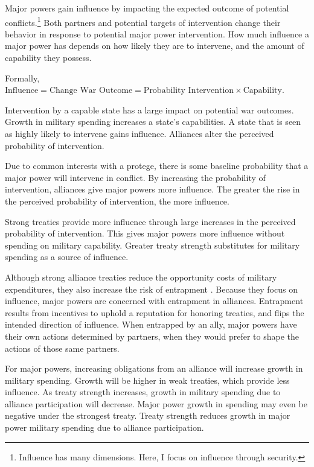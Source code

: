 \documentclass[12pt]{article}
\begin{document}
Major powers gain influence by impacting the expected outcome of potential conflicts.\footnote{Influence has many dimensions. Here, I focus on influence through security.} 
Both partners and potential targets of intervention change their behavior in response to potential major power intervention. 
How much influence a major power has depends on how likely they are to intervene, and the amount of capability they possess. 


Formally, $\mbox{Influence} = \mbox{Change War Outcome} = \mbox{Probability Intervention} \times \mbox{Capability}$.


Intervention by a capable state has a large impact on potential war outcomes.
Growth in military spending increases a state's capabilities.  
A state that is seen as highly likely to intervene gains influence.
Alliances alter the perceived probability of intervention. 


Due to common interests with a protege, there is some baseline probability that a major power will intervene in conflict. 
By increasing the probability of intervention, alliances give major powers more influence. 
The greater the rise in the perceived probability of intervention, the more influence.


Strong treaties provide more influence through large increases in the perceived probability of intervention. 
This gives major powers more influence without spending on military capability. 
Greater treaty strength substitutes for military spending as a source of influence.  


Although strong alliance treaties reduce the opportunity costs of military expenditures, they also increase the risk of entrapment \citep{Snyder1997, Benson2012, Yarhi-Miloetal2016}.
Because they focus on influence, major powers are concerned with entrapment in alliances. 
Entrapment results from incentives to uphold a reputation for honoring treaties, and flips the intended direction of influence. 
When entrapped by an ally, major powers have their own actions determined by partners, when they would prefer to shape the actions of those same partners. 


For major powers, increasing obligations from an alliance will increase growth in military spending. 
Growth will be higher in weak treaties, which provide less influence. 
As treaty strength increases, growth in military spending due to alliance participation will decrease. 
Major power growth in spending may even be negative under the strongest treaty. 
Treaty strength reduces growth in major power military spending due to alliance participation. 
\end{document}
